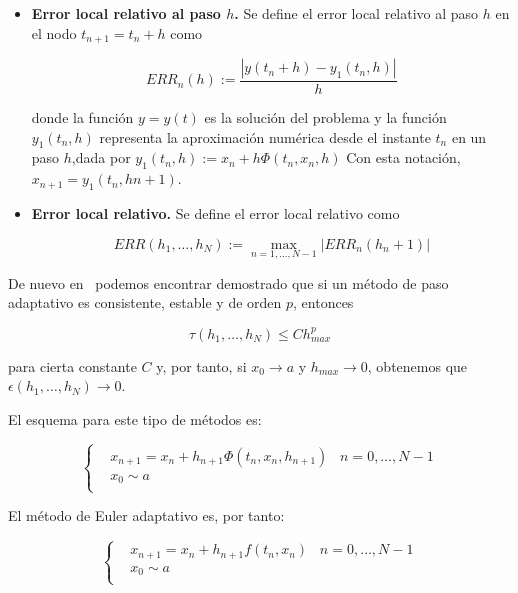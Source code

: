 \begin{itemize}

		\item \textbf{Error local relativo al paso $h$.} Se define el error local relativo
				al paso $h$ en el nodo $t_{n+1} = t_n + h$ como 

				\begin{equation}
						ERR_n(h) := \frac{|y(t_n + h) - y_1(t_n,h)|}{h}	
				\end{equation}

				donde la función $y = y(t)$ es la solución del problema y la
				función $y_1(t_n,h)$ representa la aproximación numérica desde
				el instante $t_n$ en un paso $h$,dada por $y_1(t_n,h) :=  x_n +
				h\Phi (t_n,x_n,h)$ Con esta notación, $x_{n+1} = y_1(t_n,hn+1)$.

		\item \textbf{Error local relativo.} Se define el error local relativo
				como 

				\begin{equation}
						ERR(h_1,\ldots,h_N):=\max_{n=1,\ldots,N-1}|ERR_n(h_n+1)|	
				\end{equation}

\end{itemize}

De nuevo en~\citet{ANNU} podemos encontrar demostrado que si un método de paso
adaptativo es consistente, estable y de orden $p$, entonces

\[\tau(h_1,\ldots,h_N) \le Ch_{max}^p\]

para cierta constante $C$ y, por tanto, si $x_0\to a$ y $h_{max}\to 0$, obtenemos que $\epsilon(h_1,\ldots,h_N)\to 0$.

El esquema para este tipo de métodos es:

\begin{equation}
		\left\{
		\begin{aligned}
			& x_{n+1} = x_n + h_{n+1}\Phi(t_n,x_n,h_{n+1}) \;\;\; n= 0,\ldots,N-1 \\
			& x_0 \sim a \\
		\end{aligned}
		\right.
\end{equation}

El método de Euler adaptativo es, por tanto:

\begin{equation}
		\left\{
		\begin{aligned}
			& x_{n+1} = x_n + h_{n+1}f(t_n,x_n) \;\;\; n= 0,\ldots,N-1 \\
			& x_0 \sim a \\
		\end{aligned}
		\right.
\end{equation}

